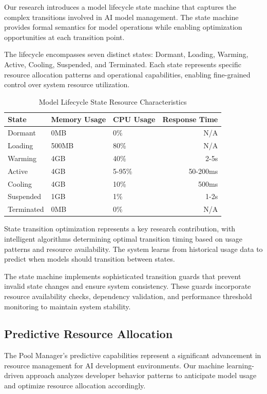 Our research introduces a model lifecycle state machine that captures the complex transitions involved in AI model management. The state machine provides formal semantics for model operations while enabling optimization opportunities at each transition point.

The lifecycle encompasses seven distinct states: Dormant, Loading, Warming, Active, Cooling, Suspended, and Terminated. Each state represents specific resource allocation patterns and operational capabilities, enabling fine-grained control over system resource utilization.

\begin{table}[ht]
\centering
\begin{tabular}{@{}lllr@{}}
\toprule
\textbf{State} & \textbf{Memory Usage} & \textbf{CPU Usage} & \textbf{Response Time} \\
\midrule
Dormant & 0MB & 0\% & N/A \\
Loading & 500MB & 80\% & N/A \\
Warming & 4GB & 40\% & 2-5s \\
Active & 4GB & 5-95\% & 50-200ms \\
Cooling & 4GB & 10\% & 500ms \\
Suspended & 1GB & 1\% & 1-2s \\
Terminated & 0MB & 0\% & N/A \\
\bottomrule
\end{tabular}
\caption{Model Lifecycle State Resource Characteristics}
\end{table}

State transition optimization represents a key research contribution, with intelligent algorithms determining optimal transition timing based on usage patterns and resource availability. The system learns from historical usage data to predict when models should transition between states.

The state machine implements sophisticated transition guards that prevent invalid state changes and ensure system consistency. These guards incorporate resource availability checks, dependency validation, and performance threshold monitoring to maintain system stability.

\subsection*{Predictive Resource Allocation}

The Pool Manager's predictive capabilities represent a significant advancement in resource management for AI development environments. Our machine learning-driven approach analyzes developer behavior patterns to anticipate model usage and optimize resource allocation accordingly.

